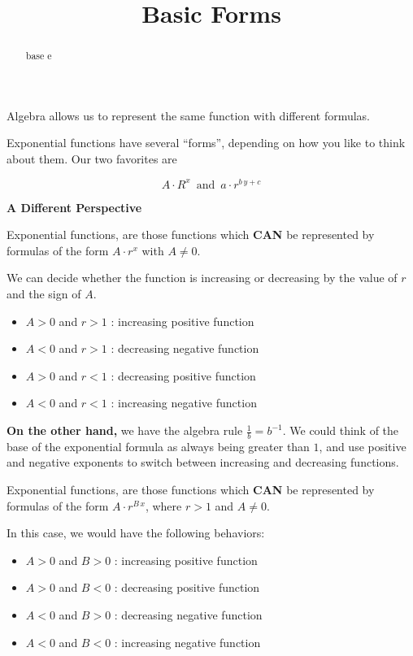 \documentclass{ximera}
\title{Basic Forms}
\begin{document}
\begin{abstract}
base e
\end{abstract}
\maketitle



Algebra allows us to represent the same function with different formulas.

Exponential functions have several ``forms'', depending on how you like to think about them. Our two favorites are

\[     A \cdot R^x \, \text{ and }  \, a \cdot r^{b \, y + c}   \]



\textbf{\textcolor{blue!55!black}{A Different Perspective}} 


Exponential functions, are those functions which \textbf{\textcolor{red!70!black}{CAN}} be represented by formulas of the form $A \cdot r^x$ with $A \ne 0$.  


We can decide whether the function is increasing or decreasing by the value of $r$ and the sign of $A$. 



\begin{itemize}
\item $A > 0$ and $r > 1$ : increasing positive function
\item $A < 0$ and $r > 1$ : decreasing negative function  
\item $A > 0$ and $r < 1$ : decreasing positive function
\item $A < 0$ and $r < 1$ : increasing negative function  
\end{itemize}



\textbf{On the other hand,} we have the algebra rule $\frac{1}{b} = b^{-1}$.  We could think of the base of the exponential formula as always being greater than $1$, and use positive and negative exponents to switch between increasing and decreasing functions. 


Exponential functions, are those functions which \textbf{\textcolor{red!70!black}{CAN}} be represented by formulas of the form $A \cdot r^{B \, x}$, where $r > 1$ and $A \ne 0$.  


In this case, we would have the following behaviors: 


\begin{itemize}
\item $A > 0$ and $B > 0$ : increasing positive function
\item $A > 0$ and $B < 0$ : decreasing positive function
\item $A < 0$ and $B > 0$ : decreasing negative function  
\item $A < 0$ and $B < 0$ : increasing negative function  
\end{itemize}
\end{document}

